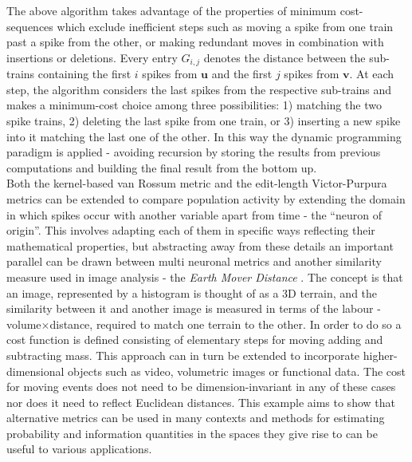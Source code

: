 \documentclass[12pt]{extarticle}
\begin{document}
\noindent
The above algorithm takes advantage of the properties of minimum
cost-sequences which exclude inefficient steps such as moving a spike
from one train past a spike from the other, or making redundant moves
in combination with insertions or deletions. Every entry $G_{i,j}$
denotes the distance between the sub-trains containing the first $i$
spikes from $\mathbf{u}$ and the first $j$ spikes from
$\mathbf{v}$. At each step, the algorithm considers the last spikes
from the respective sub-trains and makes a minimum-cost choice among
three possibilities: 1) matching the two spike trains, 2) deleting the
last spike from one train, or 3) inserting a new spike into it
matching the last one of the other. In this way the dynamic
programming paradigm is applied - avoiding recursion by storing the
results from previous computations and building the final result from
the bottom up.\\

\noindent
Both the kernel-based van Rossum metric and the edit-length
Victor-Purpura metrics can be extended to compare population activity
by extending the domain in which spikes occur with another variable
apart from time - the ``neuron of origin''. This involves adapting
each of them in specific ways reflecting their mathematical
properties, but abstracting away from these details an important
parallel can be drawn between multi neuronal metrics and another
similarity measure used in image analysis - the\textit{ Earth Mover
  Distance} \cite{Rubner.Earth-mover}. The concept is that an image, 
represented by a histogram is thought of as a 3D terrain, and
the similarity between it and another image is measured in terms of
the labour - volume$\times$distance, required to match one terrain to
the other. In order to do so a cost function is
defined consisting of elementary steps for moving adding and subtracting
mass. This approach can in turn be extended to incorporate
higher-dimensional objects such as video, volumetric images or
functional data. The cost for moving events does not need to be
dimension-invariant in any of these cases nor does it need to reflect
Euclidean distances. This example aims to show that alternative
metrics can be used in many contexts and methods for estimating
probability and information quantities in the spaces they give rise to
can be useful to various applications.\\
\end{document}
